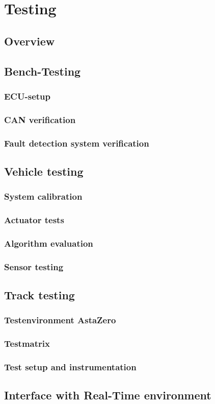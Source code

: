 \documentclass[ExampleMasters.tex]{subfiles}
\begin{document}
\clearpage
\chapter{Testing}
\label{chap:testing}

\section{Overview}



\section{Bench-Testing}
\label{sec:bench-testing}
\subsection{ECU-setup}
\subsection{CAN verification}
\subsection{Fault detection system verification}



\section{Vehicle testing}
\label{sec:vehicle-testing}

\subsection{System calibration}
\subsection{Actuator tests}
\subsection{Algorithm evaluation}
\subsection{Sensor testing}


\section{Track testing}
\label{sec:track-testing}
\subsection{Testenvironment AstaZero}
\subsection{Testmatrix}
\subsection{Test setup and instrumentation}


\section{Interface with Real-Time environment}
\end{document}

